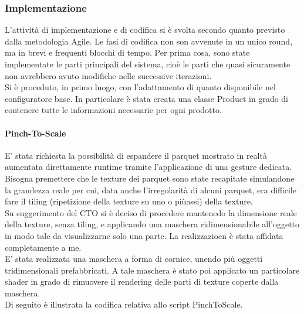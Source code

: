 \subsubsection{Implementazione}
L'attivit\`a di implementazione e di codifica si \`e svolta secondo quanto previsto dalla metodologia Agile. Le fasi di codifica non son avvenute in un unico round, ma in brevi e frequenti blocchi di tempo. Per prima cosa, sono state implementate le parti principali del sistema, cio\`e le parti che quasi sicuramente non avrebbero avuto modifiche nelle successive iterazioni.\\

Si \`e proceduto, in primo luogo, con l'adattamento di quanto disponibile nel configuratore base. In particolare \`e stata creata una classe Product in grado di contenere tutte le informazioni necessarie per ogni prodotto.\\

\paragraph{Pinch-To-Scale}
E' stata richiesta la possibilit\`a di espandere il parquet mostrato in realt\`a aumentata direttamente runtime tramite l'applicazione di una gesture dedicata.\\
Bisogna premettere che le texture dei parquet sono state recapitate simulandone la grandezza reale per cui, data anche l'irregolarit\`a di alcuni parquet, era difficile fare il tiling (ripetizione della texture su uno o pi\`uassi) della texture.\\
Su suggerimento del CTO si \`e deciso di procedere mantenedo la dimensione reale della texture, senza tiling, e applicando una maschera ridimensionabile all'oggetto in modo tale da visualizzarne solo una parte. La realizzazioen \`e stata affidata completamente a me.\\
E' stata realizzata una maschera a forma di cornice, unendo pi\`u oggetti tridimensionali prefabbricati. A tale maschera \`e stato poi applicato un particolare shader in grado di rimuovere il rendering delle parti di texture coperte dalla maschera.\\
Di seguito \`e illustrata la codifica relativa allo script PinchToScale.

